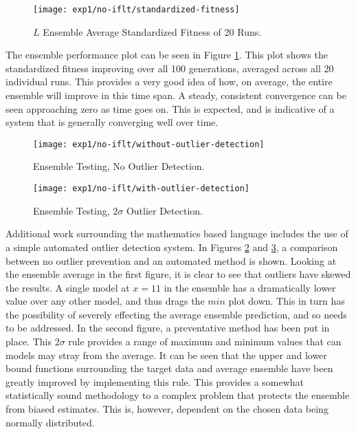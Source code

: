 \documentclass[12pt, letterpaper]{article}
\begin{document}
\begin{figure}[!htb]
\centering
\texttt{[image: exp1/no-iflt/standardized-fitness]}
\caption{ $L$ Ensemble Average Standardized Fitness of 20 Runs.}
\label{no-iflt-conv}
\end{figure}

\textrm{ \indent The ensemble performance plot can be seen in Figure \ref{no-iflt-conv}. This plot shows the standardized fitness improving over all 100 generations, averaged across all 20 individual runs. This provides a very good idea of how, on average, the entire ensemble will improve in this time span. A steady, consistent convergence can be seen approaching zero as time goes on. This is expected, and is indicative of a system that is generally converging well over time.}

\begin{figure}[!htb]
\centering
\texttt{[image: exp1/no-iflt/without-outlier-detection]}
\caption{ Ensemble Testing, No Outlier Detection.}
\label{no-iflt-without-outlier}
\end{figure}

\begin{figure}[!htb]
\centering
\texttt{[image: exp1/no-iflt/with-outlier-detection]}
\caption{ Ensemble Testing, $2\sigma$ Outlier Detection.}
\label{no-iflt-with-outlier}
\end{figure}

\textrm{ \indent Additional work surrounding the mathematics based language includes the use of a simple automated outlier detection system. In Figures \ref{no-iflt-without-outlier} and \ref{no-iflt-with-outlier}, a comparison between no outlier prevention and an automated method is shown. Looking at the ensemble average in the first figure, it is clear to see that outliers have skewed the results. A single model at $x=11$ in the ensemble has a dramatically lower value over any other model, and thus drags the $min$ plot down. This in turn has the possibility of severely effecting the average ensemble prediction, and so needs to be addressed. In the second figure, a preventative method has been put in place.  This $2\sigma$ rule provides a range of maximum and minimum values that can models may stray from the average. It can be seen that the upper and lower bound functions surrounding the target data and average ensemble have been greatly improved by implementing this rule. This provides a somewhat statistically sound methodology to a complex problem that protects the ensemble from biased estimates. This is, however, dependent on the chosen data being normally distributed. }
\end{document}
